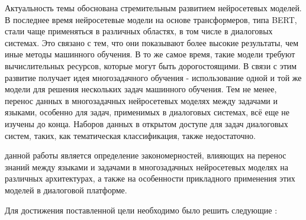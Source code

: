 
{\actuality} 
Актуальность темы обоснована стремительным развитием нейросетевых моделей. В последнее время нейросетевые модели на основе трансформеров, типа BERT, стали чаще применяться в различных областях, в том числе в диалоговых системах. Это связано с тем, что они показывают более высокие результаты, чем иные методы машинного обучения. В то же самое время, такие модели требуют вычислительных ресурсов, которые могут быть дорогостоящими. В связи с этим развитие получает идея многозадачного обучения - использование одной и той же модели для решения нескольких задач машинного обучения. Тем не менее, перенос данных в многозадачных нейросетевых моделях между задачами и языками, особенно для задач, применимых в диалоговых системах, всё еще не изучены до конца. Наборов данных в открытом доступе для задач диалоговых систем, таких, как тематическая классификация, также недостаточно.


{\aim} данной работы является определение закономерностей, влияющих на перенос знаний между языками и задачами в многозадачных нейросетевых моделях на различных архитектурах, а также на особенности прикладного применения этих моделей в диалоговой платформе.

Для достижения поставленной цели необходимо было решить следующие {\tasks}:

